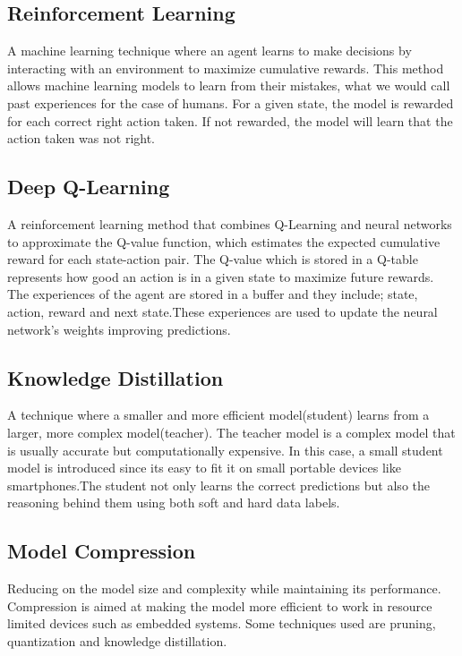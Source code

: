 \documentclass[8pt]{article}
\begin{document}
\subsection{Reinforcement Learning}
 A machine learning technique where an agent learns to make decisions by interacting with an environment to maximize cumulative rewards. This method allows machine learning models to learn from their mistakes, what we would call past experiences for the case of humans. For a given state, the model is rewarded for each correct right action taken. If not rewarded, the model will learn that the action taken was not right.
\subsection{Deep Q-Learning}
A reinforcement learning method that combines Q-Learning and neural networks to approximate the Q-value function, which estimates the expected cumulative reward for each state-action pair. The Q-value which is stored in a Q-table represents how good an action is in a given state to maximize future rewards. The experiences of the agent are stored in a buffer and they include; state, action, reward and next state.These experiences are used to update the neural network's weights improving predictions.
\subsection{Knowledge Distillation}
A technique where a smaller and more efficient model(student) learns from a larger, more complex model(teacher). The teacher model is a complex model that is usually accurate but computationally expensive. In this case, a small student model is introduced since its easy to fit it on small portable devices like smartphones.The student not only learns the correct predictions but also the reasoning behind them using both soft and hard data labels.
\subsection{Model Compression}
Reducing on the model size and complexity while maintaining its performance. Compression is aimed at making the model more efficient to work in resource limited devices such as embedded systems. Some techniques used are pruning, quantization and knowledge distillation.
\end{document}

